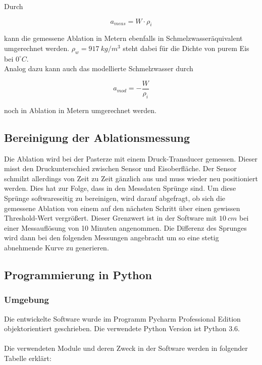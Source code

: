 \documentclass[11pt,a4paper]{article}
\begin{document}
Durch 

\begin{equation}
a_{meas} = W \cdot \rho_{i}
\end{equation}


kann die gemessene Ablation in Metern ebenfalls in Schmelzwasseräquivalent umgerechnet werden. $\rho_{w}=917~kg/m^3$ steht dabei für die Dichte von purem Eis bei $0^\circ C$.\\

Analog dazu kann auch das modellierte Schmelzwasser durch

\begin{equation}
a_{mod} = -\frac{W}{\rho_{i}}
\end{equation}

noch in Ablation in Metern umgerechnet werden.

\subsection{Bereinigung der Ablationsmessung}
Die Ablation wird bei der Pasterze mit einem Druck-Transducer gemessen. Dieser misst den Druckunterschied zwischen Sensor und Eisoberfläche. Der Sensor schmilzt allerdings von Zeit zu Zeit gänzlich aus und muss wieder neu positioniert werden. Dies hat zur Folge, dass in den Messdaten Sprünge sind. Um diese Sprünge softwareseitig zu bereinigen, wird darauf abgefragt, ob sich die gemessene Ablation von einem auf den nächsten Schritt über einen gewissen Threshold-Wert vergrößert. Dieser Grenzwert ist in der Software mit $10~cm$ bei einer Messauflösung von 10 Minuten angenommen. Die Differenz des Sprunges wird dann bei den folgenden Messungen angebracht um so eine stetig abnehmende Kurve zu generieren.



\subsection{Programmierung in Python}
\subsubsection{Umgebung}

Die entwickelte Software wurde im Programm Pycharm Professional Edition objektorientiert geschrieben. Die verwendete Python Version ist Python 3.6.\\\\
Die verwendeten Module und deren Zweck in der Software werden in folgender Tabelle erklärt:
\end{document}
